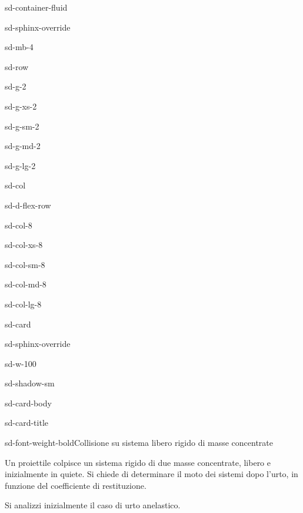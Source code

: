 \documentclass[letterpaper,10pt,italian]{jupyterBook}
\begin{document}
\begin{sphinxuseclass}{sd-container-fluid}
\begin{sphinxuseclass}{sd-sphinx-override}
\begin{sphinxuseclass}{sd-mb-4}
\begin{sphinxuseclass}{sd-row}
\begin{sphinxuseclass}{sd-g-2}
\begin{sphinxuseclass}{sd-g-xs-2}
\begin{sphinxuseclass}{sd-g-sm-2}
\begin{sphinxuseclass}{sd-g-md-2}
\begin{sphinxuseclass}{sd-g-lg-2}
\begin{sphinxuseclass}{sd-col}
\begin{sphinxuseclass}{sd-d-flex-row}
\begin{sphinxuseclass}{sd-col-8}
\begin{sphinxuseclass}{sd-col-xs-8}
\begin{sphinxuseclass}{sd-col-sm-8}
\begin{sphinxuseclass}{sd-col-md-8}
\begin{sphinxuseclass}{sd-col-lg-8}
\begin{sphinxuseclass}{sd-card}
\begin{sphinxuseclass}{sd-sphinx-override}
\begin{sphinxuseclass}{sd-w-100}
\begin{sphinxuseclass}{sd-shadow-sm}
\begin{sphinxuseclass}{sd-card-body}
\begin{sphinxuseclass}{sd-card-title}
\begin{sphinxuseclass}{sd-font-weight-bold}Collisione su sistema libero rigido di masse concentrate
\end{sphinxuseclass}
\end{sphinxuseclass}
\sphinxAtStartPar
Un proiettile colpisce un sistema rigido di due masse concentrate, libero e inizialmente in quiete. Si chiede di determinare il moto dei sistemi dopo l’urto, in funzione del coefficiente di restituzione.

\sphinxAtStartPar
Si analizzi inizialmente il caso di urto anelastico.


\end{sphinxuseclass}
\end{sphinxuseclass}
\end{sphinxuseclass}
\end{sphinxuseclass}
\end{sphinxuseclass}
\end{sphinxuseclass}
\end{sphinxuseclass}
\end{sphinxuseclass}
\end{sphinxuseclass}
\end{sphinxuseclass}
\end{sphinxuseclass}
\end{sphinxuseclass}
\end{sphinxuseclass}
\end{sphinxuseclass}
\end{sphinxuseclass}
\end{sphinxuseclass}
\end{sphinxuseclass}
\end{sphinxuseclass}
\end{sphinxuseclass}
\end{sphinxuseclass}
\end{sphinxuseclass}
\end{document}
